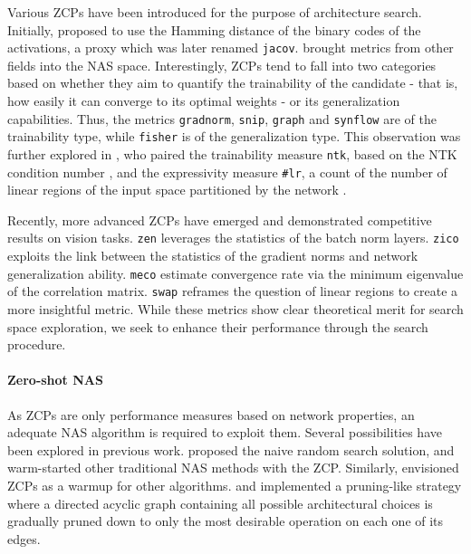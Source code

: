 \documentclass[10pt]{article} %
\begin{document}
Various ZCPs have been introduced for the purpose of architecture search. Initially, \citet{mellor2021neural} proposed to use the Hamming distance of the binary codes of the activations, a proxy which was later renamed \texttt{jacov}. \citet{abdelfattah2021zero} brought metrics from other fields into the NAS space. Interestingly, ZCPs tend to fall into two categories based on whether they aim to quantify the trainability of the candidate - that is, how easily it can converge to its optimal weights - or its generalization capabilities. Thus, the metrics \texttt{gradnorm}, \texttt{snip}, \texttt{graph} and \texttt{synflow} are of the trainability type, while \texttt{fisher} is of the generalization type. This observation was further explored in \citet{chen2021neural}, who paired the trainability measure \texttt{ntk}, based on the NTK condition number \citep{xiao2019disentangling}, and the expressivity measure \texttt{\#lr}, a count of the number of linear regions of the input space partitioned by the network \citep{raghu2017expressive}.

Recently, more advanced ZCPs have emerged and demonstrated competitive results on vision tasks. \texttt{zen} \citep{lin2021zen} leverages the statistics of the batch norm layers. \texttt{zico} \citep{li2023zico} exploits the link between the statistics of the gradient norms and network generalization ability. \texttt{meco} \citep{jiang2023meco} estimate convergence rate via the minimum eigenvalue of the correlation matrix. \texttt{swap} \citep{peng2024swap} reframes the question of linear regions to create a more insightful metric. While these metrics show clear theoretical merit for search space exploration, we seek to enhance their performance through the search procedure.

\paragraph{Zero-shot NAS} As ZCPs are only performance measures based on network properties, an adequate NAS algorithm is required to exploit them. Several possibilities have been explored in previous work. \citet{mellor2021neural} proposed the naive random search solution, and warm-started other traditional NAS methods with the ZCP. Similarly, \citet{abdelfattah2021zero} envisioned ZCPs as a warmup for other algorithms. \citet{chen2021neural} and \citet{jiang2023meco} implemented a pruning-like strategy where a directed acyclic graph containing all possible architectural choices is gradually pruned down to only the most desirable operation on each one of its edges. 
\end{document}
